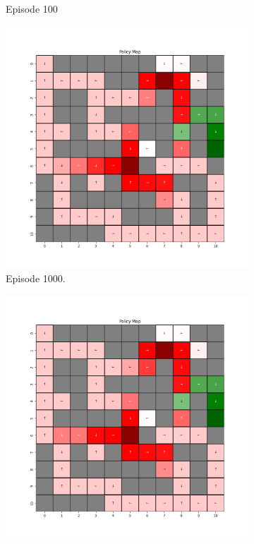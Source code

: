 \documentclass{assignment}
\begin{document}
\begin{figure}[H]
\begin{subfigure}{0.3\textwidth}
    \caption{Episode 100}
    \end{subfigure}
    \begin{subfigure}{0.3\textwidth}
        \includegraphics[width=\textwidth]{figures/policy_td/alpha_sweep/policy_alpha_1_gamma_0.95_epsilon_0.2_iteration_1000.png}
    \caption{Episode 1000.}
    \end{subfigure}\hfill
    \begin{subfigure}{0.3\textwidth}
        \includegraphics[width=\textwidth]{figures/policy_td/alpha_sweep/policy_alpha_1_gamma_0.95_epsilon_0.2_iteration_5000.png}

\end{subfigure}
\end{figure}
\end{document}
